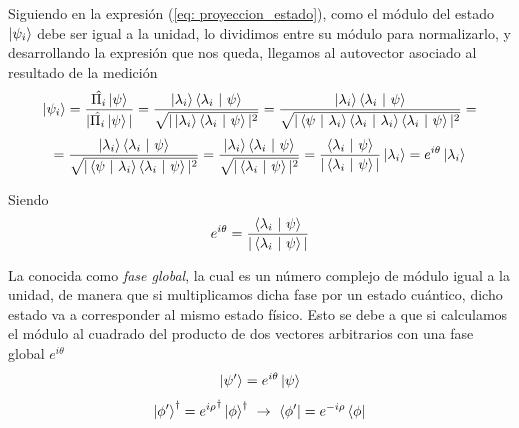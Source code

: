 \documentclass{article}
\numberwithin{equation}{section} %
\begin{document}
    Siguiendo en la expresión (\ref{eq: proyeccion_estado}), como el módulo del estado \( \ket{\psi_{i}} \) debe ser igual a la unidad, lo dividimos entre su módulo para normalizarlo, y desarrollando la expresión que nos queda, llegamos al autovector asociado al resultado de la medición
    \vspace{1mm}
    \begin{equation*}
        \ket{\psi_{i}} = \frac{\hat{\Pi_{i}} \ket{\psi}}{| \hat{\Pi_{i}} \ket{\psi} |} = \frac{\ket{\lambda_{i}} \braket{\lambda_{i} \ | \ \psi}}{\sqrt{| \ket{\lambda_{i}} \braket{\lambda_{i} \ | \ \psi} | ^ {2}}} = \frac{\ket{\lambda_{i}} \braket{\lambda_{i} \ | \ \psi}}{\sqrt{| \braket{\psi \ | \ \lambda_{i}} \braket{\lambda_{i} \ | \ \lambda_{i}} \braket{\lambda_{i} \ | \ \psi} | ^ {2}}} = 
    \end{equation*}
    \begin{equation*}
        = \frac{\ket{\lambda_{i}} \braket{\lambda_{i} \ | \ \psi}}{\sqrt{| \braket{\psi \ | \ \lambda_{i}} \braket{\lambda_{i} \ | \ \psi} | ^ {2}}} = \frac{\ket{\lambda_{i}} \braket{\lambda_{i} \ | \ \psi}}{\sqrt{| \braket{\lambda_{i} \ | \ \psi} | ^ {2}}} = \frac{\braket{\lambda_{i} \ | \ \psi}}{| \braket{\lambda_{i} \ | \ \psi} |} \ket{\lambda_{i}} = e^{i \theta} \ket{\lambda_{i}}
    \end{equation*}

    \vspace{1.5mm}

    Siendo
    \begin{equation}
        e ^ {i \theta} = \frac{\braket{\lambda_{i} \ | \ \psi}}{| \braket{\lambda_{i} \ | \ \psi} |}
    \end{equation}

    \vspace{2.5mm}

    La conocida como \textit{fase global}, la cual es un número complejo de módulo igual a la unidad, de manera que si multiplicamos dicha fase por un estado cuántico, dicho estado va a corresponder al mismo estado físico. Esto se debe a que si calculamos el módulo al cuadrado del producto de dos vectores arbitrarios con una fase global \( e ^ {i \theta} \)
    \begin{equation*}
        \ket{\psi'} = e^{i \theta} \ket{\psi}
    \end{equation*}
    \begin{equation*}
        \ket{\phi'}^{\dagger} = {e^{i \rho}}^{\dagger} \ket{\phi}^{\dagger} \ \rightarrow \ \bra{\phi'} = e^{-i \rho} \bra{\phi}
    \end{equation*}
\end{document}
